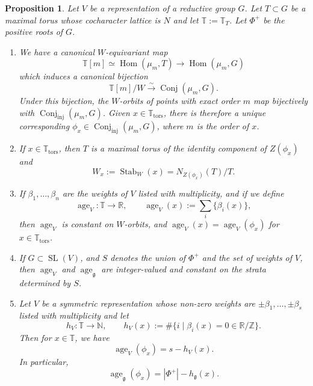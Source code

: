 \documentclass[12pt,a4paper]{amsart}
\newtheorem{proposition}[proposition]{Proposition}
\theoremstyle{definition}
\newcommand{\TT}{\mathbb T}
\newcommand{\ZZ}{\mathbb{Z}}
\newcommand{\NN}{\mathbb{N}}
\newcommand{\RR}{\mathbb{R}}
\newcommand{\g}{\mathfrak{g}}
\renewcommand{\1}{\textbf{1}}
\newcommand{\<}{\langle}
\renewcommand{\>}{\rangle}
\DeclareMathOperator{\Stab}{Stab}
\DeclareMathOperator{\age}{age}
\DeclareMathOperator{\Hom}{Hom}
\DeclareMathOperator{\tors}{tors}
\DeclareMathOperator{\SL}{SL}
\DeclareMathOperator{\Conj}{Conj}
\DeclareMathOperator{\inj}{inj}
\begin{document}
\begin{proposition}\label{prop:TT-basics}
Let $V$ be a representation of a reductive group $G$. Let $T\subset G$ be a maximal torus whose cocharacter lattice is $N$ and let $\TT:=\TT_T$. Let $\Phi^+$ be the positive roots of $G$.
\begin{enumerate}
	\item\label{can-bij} We have a canonical $W$-equivariant map
	\[
		\TT[m]\simeq\Hom(\mu_m,T)\to \Hom(\mu_m,G)
	\]
	which induces a canonical bijection
	\[
		\TT[m]/W\xrightarrow{\sim}\Conj(\mu_m,G).
	\]
	Under this bijection, the $W$-orbits of points with exact order $m$ map bijectively with $\Conj_{\inj}(\mu_m,G)$. Given $x\in\TT_{\tors}$, there is therefore a unique corresponding $\phi_x\in\Conj_{\inj}(\mu_m,G)$, where $m$ is the order of $x$.
	\item\label{WxNZ} If $x\in\TT_{\tors}$, then $T$ is a maximal torus of the identity component of $Z(\phi_x)$ and
	\[
		W_x:=\Stab_W(x)=N_{Z(\phi_x)}(T)/T.
	\]
	\item\label{age-extension} If $\beta_1,\dots,\beta_n$ are the weights of $V$ listed with multiplicity, and if we define
	\[
		\age_V\colon\TT\to\RR,\qquad \age_V(x):=\sum_i\{\beta_i(x)\},
	\]
	then $\age_V$ is constant on $W$-orbits, and $\age_V(x)=\age_V(\phi_x)$ for $x\in\TT_{\tors}$.
	\item\label{strata-cnst} If $G\subset\SL(V)$, and $S$ denotes the union of $\Phi^+$ and the set of weights of $V$, then $\age_V$ and $\age_\g$ are integer-valued and constant on the strata determined by $S$.
	\item\label{hVvsage} Let $V$ be a symmetric representation whose non-zero weights are $\pm\beta_1,\dots,\pm\beta_s$ listed with multiplicity and let
	\[
		h_V\colon\TT\to\NN,\qquad h_V(x):=\#\{i\mid \beta_i(x)=0\in\RR/\ZZ\}.
	\]
	Then for $x\in\TT$, we have
	\[
		\age_V(\phi_x)=s-h_V(x).
	\]
	In particular,
	\[
		\age_\g(\phi_x)=|\Phi^+|-h_\g(x).
	\]
\end{enumerate}
\end{proposition}
\end{document}
